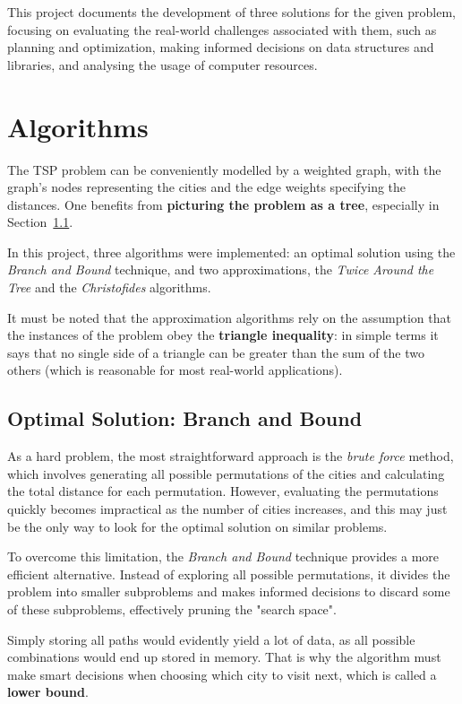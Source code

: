 \documentclass[12pt]{article}
\begin{document}
This project documents the development of three solutions for the given problem, 
focusing on evaluating the real-world challenges associated with them, such as planning and 
optimization, making informed decisions on data structures and libraries, and 
analysing the usage of computer resources.

\section{Algorithms} \label{sec:algorithms}

The TSP problem can be conveniently modelled by a weighted graph, with the graph's 
nodes representing the cities and the edge weights specifying the distances. One benefits 
from \textbf{picturing the problem as a tree}, especially in Section~\ref{sec:optimal_explanation}.

In this project, three algorithms were implemented: an optimal solution using the \textit{Branch and Bound} technique, and two approximations, the \textit{Twice Around the Tree} and the 
\textit{Christofides} algorithms.

It must be noted that the approximation algorithms rely on the assumption that the instances of the problem obey the \textbf{triangle inequality}: in simple terms it says that no single side of a triangle can be greater than the sum of the two others (which is reasonable for most real-world applications).

\subsection{Optimal Solution: Branch and Bound} \label{sec:optimal_explanation}

As a hard problem, the most straightforward approach is the \textit{brute force} method, which involves generating all possible permutations of the cities and calculating the total distance for each permutation. However, evaluating the permutations quickly becomes impractical as the number of cities increases, and this may just be the only way to look for the optimal solution on similar problems.

To overcome this limitation, the \textit{Branch and Bound} technique provides a more efficient alternative. Instead of exploring all possible permutations, it divides the problem into smaller subproblems and makes informed decisions to discard some of these subproblems, effectively pruning the "search space".

Simply storing all paths would evidently yield a lot of data, as all possible combinations would end up stored in memory. That is why the algorithm must make smart decisions when choosing which city to visit next, which is called a \textbf{lower bound}.
\end{document}
